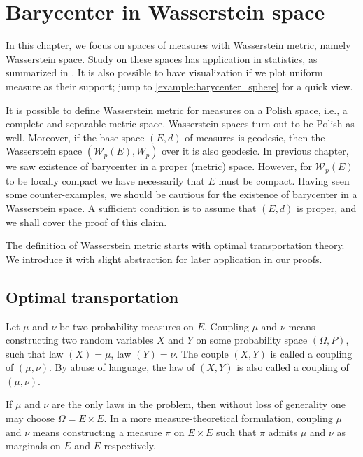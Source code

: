 \chapter{Barycenter in Wasserstein space}

In this chapter,
we focus on spaces of measures with Wasserstein metric, namely Wasserstein space.
Study on these spaces has application in statistics,
as summarized in \cite{le2017existence}.
It is also possible to have visualization if we plot uniform measure as their support;
jump to \cref{example:barycenter_sphere} for a quick view.

It is possible to define Wasserstein metric for measures on a Polish space,
i.e., a complete and separable metric space.
Wasserstein spaces turn out to be Polish as well.
Moreover, if the base space $(E,d)$ of measures is geodesic,
then the Wasserstein space $(\mathcal{W}_p(E), W_p)$ over it is also geodesic.
In previous chapter, we saw existence of barycenter in a proper (metric) space.
However, for $\mathcal{W}_p(E)$ to be locally compact we have necessarily that
$E$ must be compact.
Having seen some counter-examples,
we should be cautious for the existence of barycenter in a Wasserstein space.
A sufficient condition is to assume that $(E,d)$ is proper,
and we shall cover the proof of this claim.

The definition of Wasserstein metric starts with optimal transportation theory.
We introduce it with slight abstraction for later application in our proofs.

\section{Optimal transportation}

\begin{defn}[Coupling]
	Let \(  \mu \) and \(  \nu  \) be two probability measures on $E$.
	Coupling \( \mu \) and \( \nu \) means constructing two random variables \( X \) and \( Y \) on some probability space \( ( \Omega , P )\),
	such that law \( ( X ) = \mu \), law \( ( Y ) = \nu .
	\) The couple \( ( X , Y ) \) is called a coupling of \( ( \mu , \nu ) .
	\) By abuse of language,
	the law of \( ( X , Y ) \) is also called a coupling of \( ( \mu , \nu ) \).
\end{defn}

If \( \mu \) and \( \nu \) are the only laws in the problem,
then without loss of generality one may choose \( \Omega = E \times E .
\) In a more measure-theoretical formulation,
coupling \( \mu \) and \( \nu \) means constructing a measure \( \pi \) on \( E \times E \) such that \( \pi \) admits \( \mu \) and \( \nu \) as marginals on \( E \) and \( E \) respectively.

